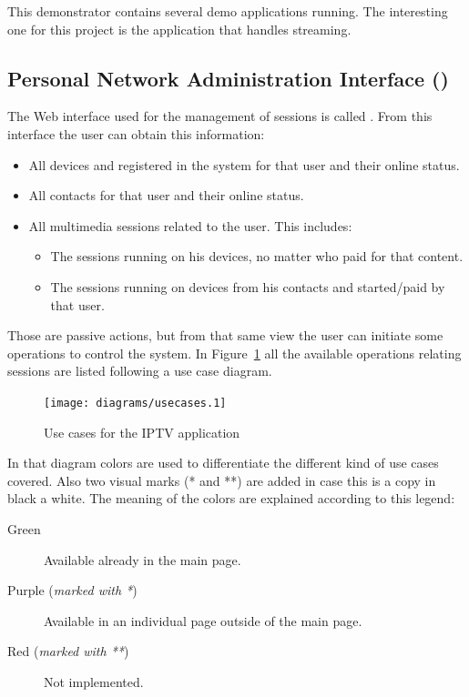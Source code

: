This demonstrator contains several demo applications running. The interesting one for this project is the application that handles  streaming.


\subsection{Personal Network Administration Interface ()} %
\label{sub:pnai}

The Web interface used for the management of sessions is called . From this interface the user can obtain this information:

\begin{itemize}
  \item All devices and registered in the system for that user and their online status.
  \item All contacts for that user and their online status.
  \item All multimedia sessions related to the user. This includes:
  \begin{itemize}
    \item The sessions running on his devices, no matter who paid for that content.
    \item The sessions running on devices from his contacts and started/paid by that user.
  \end{itemize}
\end{itemize}

Those are passive actions, but from that same view the user can initiate some operations to control the system.
In Figure~\ref{fig:usecasesiptv} all the available operations relating sessions are listed following a use case diagram.

\begin{figure}[htbp]
  \centering
    \texttt{[image: diagrams/usecases.1]}
  \caption{Use cases for the IPTV application}
  \label{fig:usecasesiptv}
\end{figure}

In that diagram colors are used to differentiate the different kind of use cases covered. Also two visual marks (* and **) are added in case this is a copy in black a white. The meaning of the colors are explained according to this legend:

\begin{description}
  \item[Green] Available already in the main  page.
  \item[Purple (\emph{marked with *})] Available in an individual page outside of the main  page.
  \item[Red (\emph{marked with **})] Not implemented.
\end{description}

